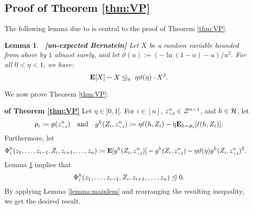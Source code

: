 \documentclass{article}
\makeatletter
\newcommand{\ro}{\uprho}
\renewenvironment{proof}[1][\proofname]{\par
	\pushQED{\qed}%
	\normalfont \topsep6\p@\@plus6\p@\relax
	\trivlist
	\item[%
	\hskip\labelsep
	\normalfont\bfseries %
	#1%
	]\ignorespaces
}{%
	\popQED\endtrivlist\@endpefalse
}
\let\qed\relax %
\DeclareRobustCommand{\qed}{%
	\ifmmode \mathqed
	\else
	\leavevmode\unskip\penalty\@M\hbox{}\nobreak\hfill%
	\hbox{\qedsymbol}%
	\fi
}
\newtheorem{lemma}[theorem]{Lemma}
\newtheorem{proposition}[theorem]{Proposition}
\makeatother
\begin{document}
\subsection{Proof of Theorem \ref{thm:VP}}
The following lemma due to \citep{mhammedi2019pac} is central to the proof of Theorem \ref{thm:VP}. %
\begin{lemma}{\bf \ [{\em un-\/}expected Bernstein]}
	\label{lem:bernsand}
	Let $X$ be a random variable bounded from {\em above} by $1$ almost surely, and let $\vartheta(u) := 
	(- \ln (1-u) - u)/u^2$. For all $0 < \eta < 1$, we have:
	\begin{align}\label{eq:blade}
	\mathbf{E}[X] - X  \trianglelefteq_{\eta} \ \eta \vartheta(\eta) \cdot X^2.
	\end{align} 
\end{lemma}
We now prove Theorem \ref{thm:VP}:
\begin{proof}{\bf{of Theorem \ref{thm:VP}}}
	Let $\eta \in]0,1[$. For $i\in[n]$, $z^n_{\smallsetminus i} \in \mathcal Z^{n-1}$, and $h\in \mathcal H$, let $$\ro_i \coloneqq \ro(z^n_{\smallsetminus i})\quad  \text{and} \quad  g^h(Z_i, z^{n}_{\smallsetminus i}) \coloneqq \eta \ell(h,Z_i) -\eta  \E_{h\sim \ro_i } [\ell(h, Z_i)].$$
	Furthermore, let
	\begin{align*}
	\Phi^{h}_i(z_1, \dots, z_{i-1}, Z_i, z_{i+1}, \dots,z_n) & \coloneqq \mathbf{E} [ g^h(Z_i, z^{n}_{\smallsetminus i}) ] - g^h(Z_i, z^{n}_{\smallsetminus i})   - \eta \vartheta(\eta) g^h(Z_i, z^{n}_{\smallsetminus i}) ^2.
	\end{align*}
	Lemma \ref{lem:bernsand} implies that 
	\begin{align}
	\Phi^{h}_i(z_1, \dots, z_{i-1}, Z_i, z_{i+1}, \dots,z_n)  \trianglelefteq  0.
	\end{align} 
	By applying Lemma \ref{lemma:mainlem} and rearranging the resulting inequality, we get the desired result.
\end{proof}
\end{document}
